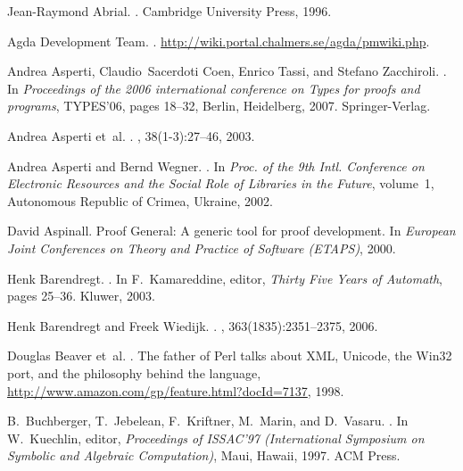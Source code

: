 \documentclass{LMCS}
\begin{document}
\begin{thebibliography}{10}

Jean-Raymond Abrial.
.
\newblock Cambridge University Press, 1996.

{Agda Development Team}.
.
\newblock \url{http://wiki.portal.chalmers.se/agda/pmwiki.php}.

Andrea Asperti, Claudio~Sacerdoti Coen, Enrico Tassi, and Stefano Zacchiroli.
.
\newblock In {\em Proceedings of the 2006 international conference on Types for
  proofs and programs}, TYPES'06, pages 18--32, Berlin, Heidelberg, 2007.
  Springer-Verlag.

Andrea Asperti et~al.
.
,
  38(1-3):27--46, 2003.

Andrea Asperti and Bernd Wegner.
.
\newblock In {\em {Proc. of the 9th Intl. Conference on Electronic Resources
  and the Social Role of Libraries in the Future}}, volume~1, Autonomous
  Republic of Crimea, Ukraine, 2002.

David Aspinall.
\newblock Proof {G}eneral: A generic tool for proof development.
\newblock In {\em European Joint Conferences on Theory and Practice of Software
  (ETAPS)}, 2000.

Henk Barendregt.
.
\newblock In F.~Kamareddine, editor, {\em Thirty Five Years of Automath}, pages
  25--36. Kluwer, 2003.

Henk Barendregt and Freek Wiedijk.
.
, 363(1835):2351--2375,
  2006.

Douglas Beaver et~al.
.
\newblock The father of Perl talks about XML, Unicode, the Win32 port, and the
  philosophy behind the language,
  \url{http://www.amazon.com/gp/feature.html?docId=7137}, 1998.

B.~Buchberger, T.~Jebelean, F.~Kriftner, M.~Marin, and D.~Vasaru.
.
\newblock In W.~Kuechlin, editor, {\em Proceedings of ISSAC'97 (International
  Symposium on Symbolic and Algebraic Computation)}, Maui, Hawaii, 1997. ACM
  Press.


\end{thebibliography}
\end{document}
